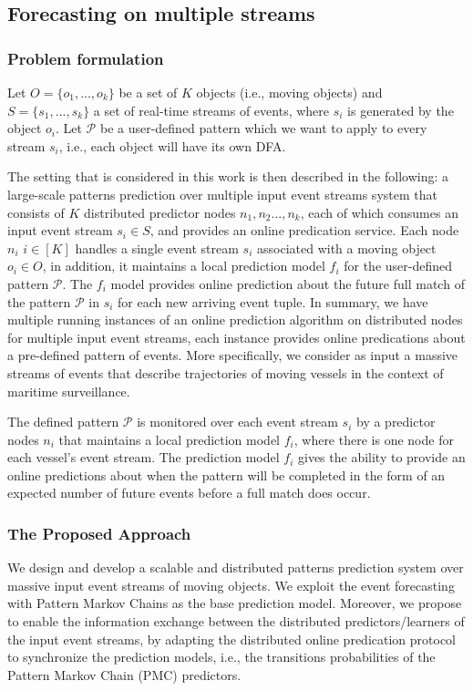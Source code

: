 \subsection{Forecasting on multiple streams}

\subsubsection{Problem formulation}
Let $O = \{ o_1, ..., o_k\}$ be a set of \emph{$K$}  objects (i.e., moving objects) 
and $S = \{ s_1, ..., s_k\}$ a set of real-time streams of events,
where $s_i$ is generated by the object $o_i$.
Let $\mathcal{P}$ be a user-defined pattern which we want to apply to every stream $s_i$,
i.e., each object will have its own DFA.

\par The setting that is considered in this work is then described in the following:
a large-scale patterns prediction over multiple input event streams system that  consists of $K$ distributed predictor nodes $n_1,n_2...,n_k$, each of which consumes an input event stream $s_i\in S$, and provides an online predication service. Each node $n_i$ $ i \in [K]$ handles a single event stream $s_i$ associated with a moving object $o_i \in O$, in addition,  it  maintains a local prediction model $f_i$ for the user-defined pattern $\mathcal{P}$. The $f_i$ model provides online prediction about the future full match of the pattern $\mathcal{P}$ in $s_i$  for each new arriving event tuple. In summary, we have multiple running instances of an online prediction algorithm on distributed nodes for multiple input event streams, each instance provides online predications about a pre-defined pattern of events. More specifically,  we consider as input a massive streams of events  that describe trajectories of moving vessels in the context of maritime surveillance.  

The defined pattern $\mathcal{P}$ is monitored over each event stream $s_i$  by a  predictor nodes  $n_i$  that maintains a local prediction model $f_i$, where there is one node for each vessel's event stream.  The prediction model $f_i$ gives the ability to provide an online predictions about when the pattern will be completed in the form of an expected number of future events before a full match does occur.

\subsubsection{The Proposed Approach}
\label{sec:proposed_approach}
\par We design and develop a scalable and distributed patterns prediction system over massive input event streams of moving objects. We  exploit the event forecasting with Pattern Markov Chains \cite{alevizos2017event} as the base prediction model. Moreover,  we propose to enable the information exchange between the distributed predictors/learners of the input event streams, by adapting the distributed online predication protocol \cite{kamp2014communication} to synchronize the prediction models, i.e., the transitions probabilities of the Pattern Markov Chain (PMC) predictors.


